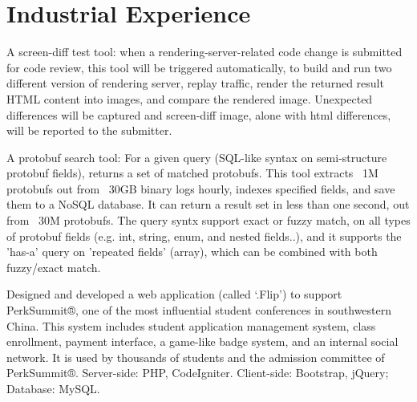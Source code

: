 \documentclass[]{deedy-resume-openfont}
\begin{document}

\section{Industrial Experience}
\begin{tightemize}
\item A screen-diff test tool: when a rendering-server-related code change is submitted for code review, this tool will be triggered automatically, to build and run two different version of rendering server, replay traffic, render the returned result HTML content into images, and compare the rendered image. Unexpected differences will be captured and screen-diff image, alone with html differences, will be reported to the submitter.
\item A protobuf search tool: For a given query (SQL-like syntax on semi-structure protobuf fields), returns a set of matched protobufs. This tool extracts ~1M protobufs out from ~30GB binary logs hourly, indexes specified fields, and save them to a NoSQL database. It can return a result set in less than one second, out from ~30M protobufs. The query syntx support exact or fuzzy match, on all types of protobuf fields (e.g. int, string, enum, and nested fields..), and it supports the 'has-a' query on 'repeated fields' (array), which can be combined with both fuzzy/exact match.
\end{tightemize}
\sectionsep


Designed and developed a web application (called ‘.Flip’) to support PerkSummit®, one of the most influential student conferences in southwestern China.
This system includes student application management system, class enrollment, payment interface, a game-like badge system, and an internal social network.
It is used by thousands of students and the admission committee of PerkSummit®.
Server-side: PHP, CodeIgniter. Client-side: Bootstrap, jQuery; Database: MySQL.
\sectionsep
\end{document}
